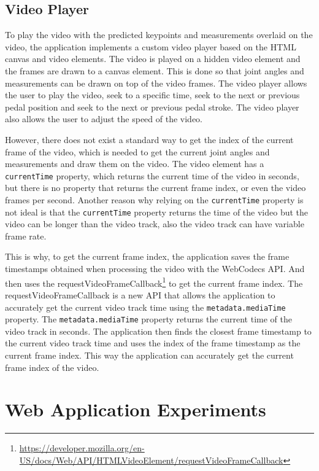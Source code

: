 \section{Video Player}
\label{video_player}
To play the video with the predicted keypoints and measurements overlaid on the video, the application implements a custom video player based on the HTML canvas and video elements. The video is played on a hidden video element and the frames are drawn to a canvas element. This is done so that joint angles and measurements can be drawn on top of the video frames. The video player allows the user to play the video, seek to a specific time, seek to the next or previous pedal position and seek to the next or previous pedal stroke. The video player also allows the user to adjust the speed of the video.

However, there does not exist a standard way to get the index of the current frame of the video, which is needed to get the current joint angles and measurements and draw them on the video. The video element has a \texttt{currentTime} property, which returns the current time of the video in seconds, but there is no property that returns the current frame index, or even the video frames per second. Another reason why relying on the \texttt{currentTime} property is not ideal is that the \texttt{currentTime} property returns the time of the video but the video can be longer than the video track, also the video track can have variable frame rate.

This is why, to get the current frame index, the application saves the frame timestamps obtained when processing the video with the WebCodecs API. And then uses the requestVideoFrameCallback\footnote{\url{https://developer.mozilla.org/en-US/docs/Web/API/HTMLVideoElement/requestVideoFrameCallback}} to get the current frame index. The requestVideoFrameCallback is a new API that allows the application to accurately get the current video track time using the \texttt{metadata.mediaTime} property. The \texttt{metadata.mediaTime} property returns the current time of the video track in seconds. The application then finds the closest frame timestamp to the current video track time and uses the index of the frame timestamp as the current frame index. This way the application can accurately get the current frame index of the video.




\chapter{Web Application Experiments}
\label{experiments}

